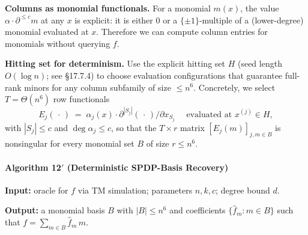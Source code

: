 \documentclass[12pt]{article}
\theoremstyle{definition}
\theoremstyle{definition}
\theoremstyle{remark}
\theoremstyle{remark}
\begin{document}
\textbf{Columns as monomial functionals.} For a monomial $m(x)$, the value $\alpha \cdot \partial^{\le c} m$ at any $x$ is explicit: it is either $0$ or a $\{\pm 1\}$-multiple of a (lower-degree) monomial evaluated at $x$. Therefore we can compute column entries for monomials without querying $f$.

\textbf{Hitting set for determinism.} Use the explicit hitting set $H$ (seed length $O(\log n)$; see \S17.7.4) to choose evaluation configurations that guarantee full-rank minors for any column subfamily of size $\le n^6$. Concretely, we select $T = \Theta(n^6)$ row functionals
\[
E_j(\,\cdot\,) \;=\; \alpha_j(x) \cdot \partial^{|S_j|}(\,\cdot\,)/\partial x_{S_j} \quad\text{ evaluated at }x^{(j)} \in H,
\]
with $|S_j| \le c$ and $\deg \alpha_j \le c$, so that the $T \times r$ matrix $[E_j(m)]_{j,m \in B}$ is nonsingular for every monomial set $B$ of size $r \le n^6$.

\paragraph{Algorithm 12$'$ (Deterministic SPDP-Basis Recovery)}

\textbf{Input:} oracle for $f$ via TM simulation; parameters $n, k, c$; degree bound $d$.

\textbf{Output:} a monomial basis $B$ with $|B| \le n^6$ and coefficients $\{\hat{f}_m : m \in B\}$ such that $f = \sum_{m \in B} \hat{f}_m\, m$.
\end{document}
